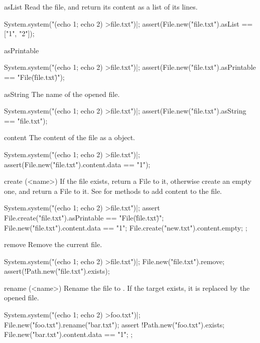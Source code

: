 \begin{urbiscriptapi}
\item[asList]
  Read the file, and return its content as a list of its lines.
\begin{urbiscript}
System.system("(echo 1; echo 2) >file.txt")|;
assert(File.new("file.txt").asList == ["1", "2"]);
\end{urbiscript}

\item[asPrintable]
\begin{urbiscript}
System.system("(echo 1; echo 2) >file.txt")|;
assert(File.new("file.txt").asPrintable == "File(\"file.txt\")");
\end{urbiscript}

\item[asString]
  The name of the opened file.
\begin{urbiscript}
System.system("(echo 1; echo 2) >file.txt")|;
assert(File.new("file.txt").asString == "file.txt");
\end{urbiscript}

\item[content]
  The content of the file as a  object.
\begin{urbiscript}
System.system("(echo 1; echo 2) >file.txt")|;
assert(File.new("file.txt").content.data == "1\n");
\end{urbiscript}

\item[create](<name>)%
  If the file  exists, return a File to it, otherwise create
  an empty one, and return a File to it.  See 
  for methods to add content to the file.
\begin{urbiscript}
System.system("(echo 1; echo 2) >file.txt")|;
assert
{
  File.create("file.txt").asPrintable == "File(\"file.txt\")";
  File.new("file.txt").content.data == "1\n";
  File.create("new.txt").content.empty;
};
\end{urbiscript}

\item[remove]
  Remove the current file.
\begin{urbiscript}
System.system("(echo 1; echo 2) >file.txt")|;
File.new("file.txt").remove;
assert(!Path.new("file.txt").exists);
\end{urbiscript}

\item[rename](<name>)%
  Rename the file to .  If the target exists, it is replaced by
  the opened file.
\begin{urbiscript}
System.system("(echo 1; echo 2) >foo.txt")|;
File.new("foo.txt").rename("bar.txt");
assert
{
  !Path.new("foo.txt").exists;
  File.new("bar.txt").content.data == "1\n";
};
\end{urbiscript}


\end{urbiscriptapi}


